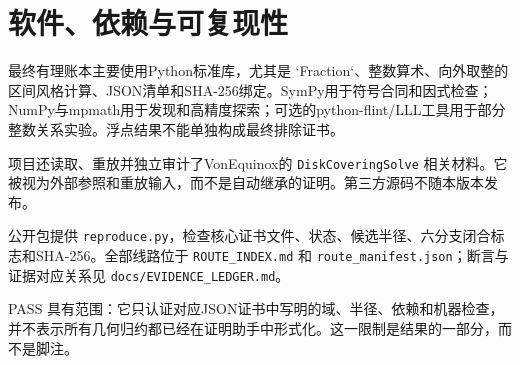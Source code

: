 \section{软件、依赖与可复现性}
最终有理账本主要使用Python标准库，尤其是 `Fraction`、整数算术、向外取整的区间风格计算、JSON清单和SHA-256绑定。SymPy用于符号合同和因式检查；NumPy与mpmath用于发现和高精度探索；可选的python-flint/LLL工具用于部分整数关系实验。浮点结果不能单独构成最终排除证书。

项目还读取、重放并独立审计了VonEquinox的 \texttt{DiskCoveringSolve} 相关材料。它被视为外部参照和重放输入，而不是自动继承的证明。第三方源码不随本版本发布。

公开包提供 \texttt{reproduce.py}，检查核心证书文件、状态、候选半径、六分支闭合标志和SHA-256。全部线路位于 \texttt{ROUTE\_INDEX.md} 和 \texttt{route\_manifest.json}；断言与证据对应关系见 \texttt{docs/EVIDENCE\_LEDGER.md}。

PASS 具有范围：它只认证对应JSON证书中写明的域、半径、依赖和机器检查，并不表示所有几何归约都已经在证明助手中形式化。这一限制是结果的一部分，而不是脚注。
